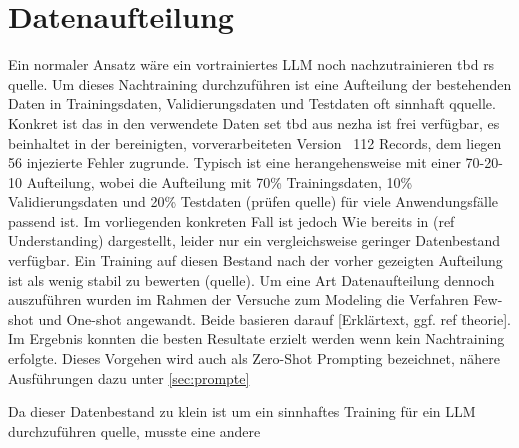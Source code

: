 \section{Datenaufteilung}
\label{sec:datasplit}
Ein normaler Ansatz wäre ein vortrainiertes LLM noch nachzutrainieren tbd rs quelle. Um dieses Nachtraining durchzuführen ist eine Aufteilung der bestehenden Daten in Trainingsdaten, Validierungsdaten und Testdaten oft sinnhaft qquelle. Konkret ist das in den verwendete Daten set tbd aus nezha ist frei verfügbar, es beinhaltet in der bereinigten, vorverarbeiteten Version ~112 Records, dem liegen 56 injezierte Fehler zugrunde. Typisch ist eine herangehensweise mit einer 70-20-10 Aufteilung, wobei die Aufteilung mit 70\% Trainingsdaten, 10\% Validierungsdaten und  20\% Testdaten (prüfen quelle) für viele Anwendungsfälle passend ist. Im vorliegenden konkreten Fall ist jedoch Wie bereits in  (ref Understanding) dargestellt, leider nur ein vergleichsweise geringer Datenbestand verfügbar. Ein Training auf diesen Bestand nach der vorher gezeigten Aufteilung ist als wenig stabil zu bewerten (quelle). Um eine Art Datenaufteilung dennoch auszuführen wurden im Rahmen der Versuche zum Modeling die Verfahren Few-shot und One-shot angewandt. Beide basieren darauf [Erklärtext, ggf. ref theorie]. Im Ergebnis konnten die besten Resultate erzielt werden wenn kein Nachtraining erfolgte. Dieses Vorgehen wird auch als Zero-Shot Prompting bezeichnet, nähere Ausführungen dazu unter \autoref{sec:prompte}


Da dieser Datenbestand zu klein ist um ein sinnhaftes Training für ein LLM durchzuführen quelle, musste eine andere 

